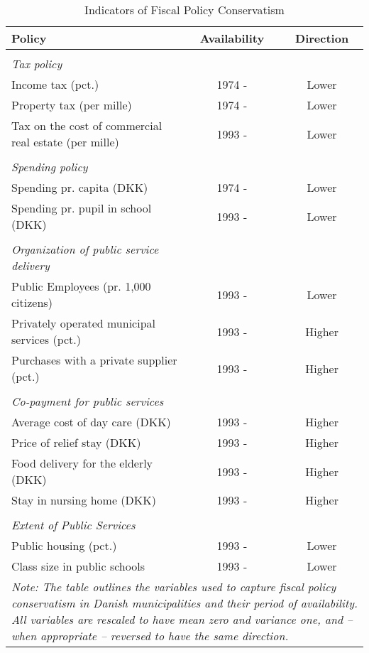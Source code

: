 \begin{table}[h]
	\centering
	\caption{Indicators of Fiscal Policy Conservatism}
	\label{tab:policies}
	\begin{tabular}{lcc} \hline
		\textbf{Policy}                          & \textbf{Availability} & \textbf{Direction} \\
		\hline
		&&\\ \textit{Tax policy} &&\\
		Income tax (pct.)                        & 1974 -     &    Lower       \\
		Property tax (per mille)                      & 1974 -     &    Lower        \\
		Tax on the cost of commercial real estate (per mille) & 1993 -     &    Lower               \\ \hline
	
		&&\\ \textit{Spending policy}  &&\\
		Spending pr. capita (DKK)                & 1974 -     &    Lower        \\
		Spending pr. pupil in school (DKK)       & 1993 -     &    Lower     \\ \hline
		
		&&\\\textit{Organization of public service delivery}  &&\\
 		Public Employees (pr. 1,000 citizens)	 & 1993 -  	  &	   Lower	     \\
 		Privately operated municipal services  (pct.) & 1993 -     &    Higher     \\
 		Purchases with a private supplier  (pct.)                   & 1993 -     &    Higher     \\ \hline
 		&&\\ \textit{Co-payment for public services} &&\\   
		Average cost of day care (DKK)                  & 1993 -     &    Higher     \\
		Price of relief stay (DKK)				 & 1993 -	  &	   Higher	 \\
		Food delivery for the  elderly (DKK) & 1993 -     &    Higher     \\
		Stay in nursing home (DKK)              & 1993 -     &    Higher     \\ \hline
	&&\\ \textit{Extent of Public Services} &&\\ 
		Public housing (pct.)                    & 1993 -     &    Lower               \\
		Class size in public schools	         & 1993 -     &    Lower       \\
		\hline \hline
		\multicolumn{3}{p{14 cm}}{\emph{Note: The table outlines the variables used to capture fiscal policy conservatism in Danish municipalities and their period of availability. All variables are rescaled to have mean zero and variance one, and -- when appropriate -- reversed to have the same direction.}}
	\end{tabular}
\end{table} 